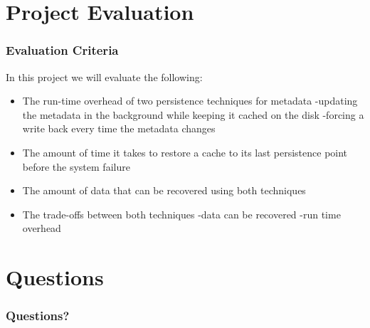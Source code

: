 \documentclass{beamer}
\begin{document}

\section{Project Evaluation}

\begin{frame}
  \frametitle{Evaluation Criteria}

  In this project we will evaluate the following:
  \begin{itemize}
    \item The run-time overhead of two persistence techniques for
    metadata
	-updating the metadata in the background while keeping it cached on the disk
	-forcing a write back every time the metadata changes
    \item The amount of time it takes to restore a cache to its last
    persistence point before the system failure

    \item The amount of data that can be recovered using both techniques

    \item The trade-offs between both techniques 
		-data can be recovered
		-run time overhead
  \end{itemize}

\end{frame}


\section{Questions}

\begin{frame}
  \frametitle{Questions?}
\end{frame}

\end{document}
